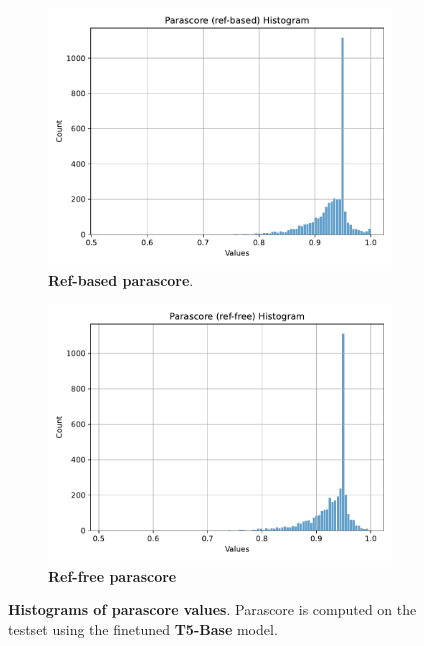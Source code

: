 \documentclass[fleqn,moreauthors,10pt]{ds_report}
\begin{document}
\begin{figure}[ht]
    \centering
    \begin{subfigure}{0.45\linewidth} %
        \centering
        \includegraphics[width=\textwidth]{report/fig/t5-base-parascore-ref-based-hist.pdf}
        \caption{\textbf{Ref-based parascore}.}
        \label{fig:t5-base-parascore-ref-based-hist}
    \end{subfigure}
    \hfill %
    \begin{subfigure}{0.45\linewidth} %
        \centering
        \includegraphics[width=\textwidth]{report/fig/t5-base-parascore-ref-free-hist.pdf}
        \caption{\textbf{Ref-free parascore}}
        \label{fig:t5-base-parascore-ref-free-hist}
    \end{subfigure}
    \caption{\textbf{Histograms of parascore values}. Parascore is computed on the testset using the finetuned \textbf{T5-Base} model.}
    \label{fig:t5-base-parascore-hist}
\end{figure}
\end{document}
